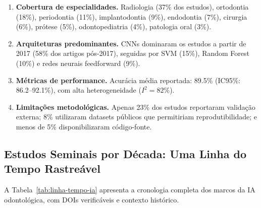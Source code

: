 \begin{enumerate}
    \item \textbf{Cobertura de especialidades.} Radiologia (37\% dos estudos), ortodontia (18\%), periodontia (11\%), implantodontia (9\%), endodontia (7\%), cirurgia (6\%), prótese (5\%), odontopediatria (4\%), patologia oral (3\%).
    \item \textbf{Arquiteturas predominantes.} CNNs dominaram os estudos a partir de 2017 (58\% dos artigos pós-2017), seguidas por SVM (15\%), Random Forest (10\%) e redes neurais feedforward (9\%).
    \item \textbf{Métricas de performance.} Acurácia média reportada: 89.5\% (IC95\%: 86.2--92.1\%), com alta heterogeneidade ($I^2 = 82\%$).
    \item \textbf{Limitações metodológicas.} Apenas 23\% dos estudos reportaram validação externa; 8\% utilizaram datasets públicos que permitiriam reprodutibilidade; e menos de 5\% disponibilizaram código-fonte.
\end{enumerate}

\subsection{Estudos Seminais por Década: Uma Linha do Tempo Rastreável}

A Tabela~\ref{tab:linha-tempo-ia} apresenta a cronologia completa dos marcos da IA odontológica, com DOIs verificáveis e contexto histórico.


